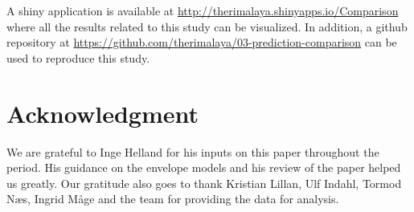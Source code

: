 \documentclass[review]{elsarticle}
\begin{document}
A shiny application \citep{shiny} is available at
\url{http://therimalaya.shinyapps.io/Comparison} where all the results
related to this study can be visualized. In addition, a github
repository at
\url{https://github.com/therimalaya/03-prediction-comparison} can be
used to reproduce this study.

\section{Acknowledgment}\label{acknowledgment}

We are grateful to Inge Helland for his inputs on this paper throughout
the period. His guidance on the envelope models and his review of the
paper helped us greatly. Our gratitude also goes to thank Kristian
Lillan, Ulf Indahl, Tormod Næs, Ingrid Måge and the team for providing
the data for analysis.

\hypertarget{refs}{}

\appendix



\renewcommand\refname{References}

\end{document}

